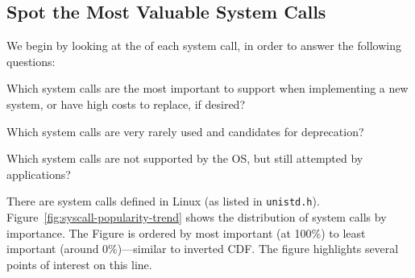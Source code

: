 \subsection{Spot the Most Valuable System Calls}
\label{sec:observation:syscall}

We begin by looking at the \usagemetric{} of each system call, 
in order to answer the following questions:
\begin{compactitem}
\item Which system calls are the most important to support when implementing a new system,
or have high costs to replace, if desired?
\item Which system calls are very rarely used and candidates for deprecation?
\item Which system calls are not supported by the OS, but still attempted by applications?
\end{compactitem}
\vspace{10pt}

There are \syscallnum{} system calls defined in \osarch{} Linux  (as listed in {\tt unistd.h}). 
Figure~\ref{fig:syscall-popularity-trend} shows the 
distribution of system calls by importance.
The Figure is ordered by most important (at 100\%) to least important (around 0\%)---similar
to inverted CDF.
The figure highlights several points of interest on this line.

